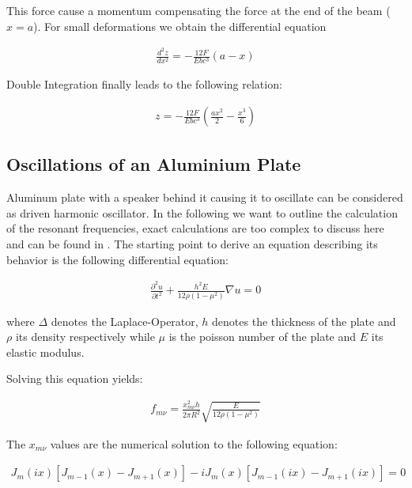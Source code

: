 This force cause a momentum compensating the force at the end of the beam ($x=a$). For small deformations we obtain the differential equation

\begin{align}
\frac{d^2z}{dx^2}=-\frac{12F}{Ebc^3}(a-x)
\end{align}

Double Integration finally leads to the following relation:

\begin{align}
z=-\frac{12F}{Ebc^3}\left(\frac{ax^2}{2}-\frac{x^3}{6} \right)
\end{align}


\subsection{Oscillations of an Aluminium Plate \label{Oscillations}}

Aluminum plate with a speaker behind it causing it to oscillate can be considered as driven harmonic oscillator. In the following we want to outline the calculation of the resonant frequencies, exact calculations are too complex to discuss here and can be found in \cite{staats}.
The starting point to derive an equation describing its behavior is the following differential equation:

\begin{align}
\frac{\partial^2 u}{\partial t^2}+\frac{h^2E}{12\rho(1-\mu^2)}\nabla u=0
\end{align}

where $\Delta$ denotes the Laplace-Operator, $h$ denotes the thickness of the plate and $\rho$ its density respectively while $\mu$ is the poisson number of the plate and $E$ its elastic modulus.

Solving this equation yields:

\begin{align}
f_{m\nu}=\frac{x_{m\nu}^2h}{2\pi R^2}\sqrt{\frac{E}{12\rho(1-\mu^2)}} \label{resfreq}
\end{align}

The $x_{m\nu}$ values are the numerical solution to the following equation:

\begin{align}
J_m(ix)\left[ J_{m-1}(x) - J_{m+1}(x)  \right]  - iJ_m(x)\left[ J_{m-1}(ix) - J_{m+1}(ix)  \right] = 0
\end{align}

